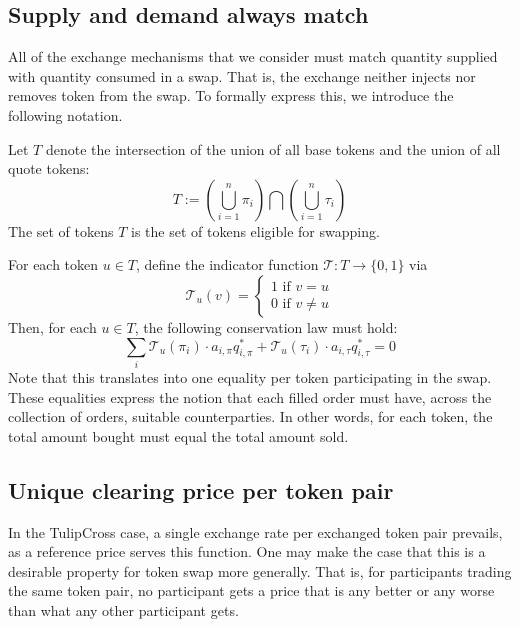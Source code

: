 \documentclass[11pt, reqno]{amsart}
\theoremstyle{definition}
\theoremstyle{remark}
\begin{document}
\subsection{Supply and demand always match}
All of the exchange mechanisms that we consider must match quantity supplied
with quantity consumed in a swap. That is, the exchange neither injects nor
removes token from the swap. To formally express this, we introduce the
following notation.

Let $T$ denote the intersection of the union of all base tokens and the union
of all quote tokens:
\[
    T :=
    \left( \bigcup_{i=1}^n \pi_i \right)
    \bigcap
    \left( \bigcup_{i=1}^n \tau_i \right)
\]
The set of tokens $T$ is the set of tokens eligible for swapping.

For each token $u \in T$, define the indicator function
$\mathcal{T}: T \to \{0, 1\}$ via
\[
    \mathcal{T}_u(v) =
    \begin{cases}
        1 \text{ if } v = u \\
        0 \text{ if } v \neq u
    \end{cases}
\]
Then, for each $u \in T$, the following conservation law must hold:
\begin{equation}\label{token_conservation_law}
    \sum_i \mathcal{T}_u(\pi_i) \cdot a_{i, \pi} q_{i, \pi}^*
    + \mathcal{T}_u(\tau_i) \cdot a_{i, \tau} q_{i, \tau}^*
    = 0
\end{equation}
Note that this translates into one equality per token participating in the
swap. These equalities express the notion that each filled order must have,
across the collection of orders, suitable counterparties. In other words,
for each token, the total amount bought must equal the total amount sold.

\subsection{Unique clearing price per token pair}

In the TulipCross case, a single exchange rate per exchanged token pair
prevails, as a reference price serves this function.
One may make the case that this is a desirable property for token swap more
generally. That is, for participants trading the same token pair, no
participant gets a price that is any better or any worse than what any other
participant gets.
\end{document}
